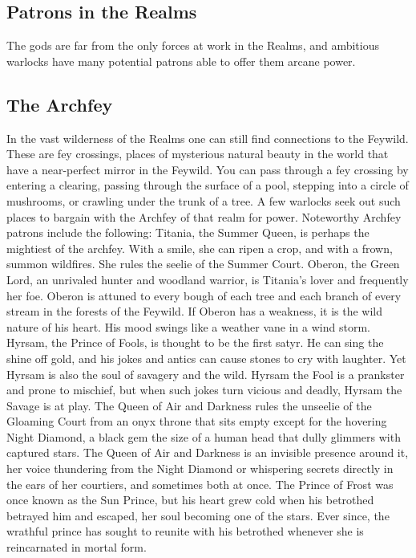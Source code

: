 \documentclass[10pt,a4paper,twoside,twocolumn,openany,bg=print,nodeprecatedcode]{dndbook}
\begin{document}
\subsection{Patrons in the Realms}
The gods are far from the only forces at work in the Realms, and ambitious warlocks have many potential patrons able to offer them arcane power.
\subsection{The Archfey}
In the vast wilderness of the Realms one can still find connections to the Feywild. These are fey crossings, places of mysterious natural beauty in the world that have a near-perfect mirror in the Feywild. You can pass through a fey crossing by entering a clearing, passing through the surface of a pool, stepping into a circle of mushrooms, or crawling under the trunk of a tree. A few warlocks seek out such places to bargain with the Archfey of that realm for power. Noteworthy Archfey patrons include the following: Titania, the Summer Queen, is perhaps the mightiest of the archfey. With a smile, she can ripen a crop, and with a frown, summon wildfires. She rules the seelie of the Summer Court. Oberon, the Green Lord, an unrivaled hunter and woodland warrior, is Titania's lover and frequently her foe. Oberon is attuned to every bough of each tree and each branch of every stream in the forests of the Feywild. If Oberon has a weakness, it is the wild nature of his heart. His mood swings like a weather vane in a wind storm. Hyrsam, the Prince of Fools, is thought to be the first satyr. He can sing the shine off gold, and his jokes and antics can cause stones to cry with laughter. Yet Hyrsam is also the soul of savagery and the wild. Hyrsam the Fool is a prankster and prone to mischief, but when such jokes turn vicious and deadly, Hyrsam the Savage is at play. The Queen of Air and Darkness rules the unseelie of the Gloaming Court from an onyx throne that sits empty except for the hovering Night Diamond, a black gem the size of a human head that dully glimmers with captured stars. The Queen of Air and Darkness is an invisible presence around it, her voice thundering from the Night Diamond or whispering secrets directly in the ears of her courtiers, and sometimes both at once. The Prince of Frost was once known as the Sun Prince, but his heart grew cold when his betrothed betrayed him and escaped, her soul becoming one of the stars. Ever since, the wrathful prince has sought to reunite with his betrothed whenever she is reincarnated in mortal form.
\end{document}

